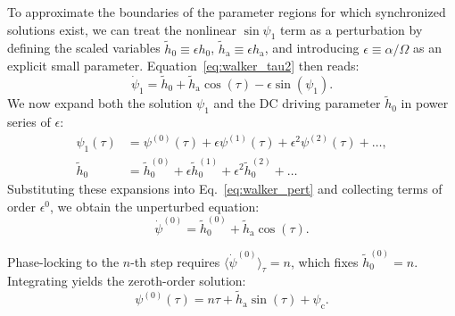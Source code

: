\documentclass[prb,aps,twocolumn,superscriptaddress,floatfix]{revtex4-1}
\begin{document}
To approximate the boundaries of the parameter regions for which synchronized solutions exist, we can treat the nonlinear $\sin\psi_1$ term as a perturbation by defining the scaled variables $\tilde h_0 \equiv \epsilon h_0$, $\tilde h_\text{a} \equiv \epsilon h_\text{a}$, and introducing $\epsilon \equiv \alpha /\Omega$ as an explicit small parameter. Equation~\eqref{eq:walker_tau2} then reads:
%
\begin{equation}
    \dot{\psi}_1 = \tilde h_0 + \tilde h_\text{a}\cos(\tau) - \epsilon \sin(\psi_1).
    \label{eq:walker_pert}
\end{equation}
%
We now expand both the solution $\psi_1$ and the DC driving parameter $\tilde h_0$ in power series of $\epsilon$:
%
\begin{align}
    \psi_1(\tau) &= \psi^{(0)}(\tau) + \epsilon \psi^{(1)}(\tau) + \epsilon^2 \psi^{(2)}(\tau) + \dots, \\
    \tilde h_0 &= \tilde h_0^{(0)} + \epsilon \tilde h_0^{(1)} + \epsilon^2 \tilde h_0^{(2)} + \dots
    \label{eq:expansion2}
\end{align}
%
Substituting these expansions into Eq.~\eqref{eq:walker_pert} and collecting terms of order $\epsilon^0$, we obtain the unperturbed equation:
%
\begin{equation}
    \dot{\psi}^{(0)} = \tilde h_0^{(0)} + \tilde h_\text{a} \cos(\tau).
\end{equation}

Phase-locking to the $n$-th step requires $\langle \dot{\psi}^{(0)} \rangle_\tau = n$, which fixes $\tilde h_0^{(0)} = n$. Integrating yields the zeroth-order solution:
%
\begin{equation}
    \psi^{(0)}(\tau) = n\tau + \tilde h_\text{a} \sin(\tau) + \psi_\text{c}.
    \label{eq:walker_zeroth}
\end{equation}
\end{document}

